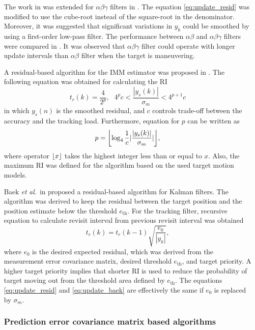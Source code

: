 \documentclass[english, 12pt, a4paper, elec, utf8, a-1b, online]{aaltothesis}
\numberwithin{equation}{section}
\newcommand{\etal}{\textit{et al}.~}
\newcommand{\ri}{t_r}
\DeclarePairedDelimiter\floor{\lfloor}{\rfloor}
\begin{document}
The work in \cite{Cohen1986} was extended for $\alpha\beta\gamma$ filters \cite{Brookner1998} in \cite{Gardner1988}. 
The equation \eqref{eq:update_resid} was modified to use the cube-root instead of the square-root in the denominator.
Moreover, it was suggested that significant variations in $y_k$ could be smoothed by using a first-order low-pass filter.
The performance between $\alpha\beta$ and $\alpha\beta\gamma$ filters were compared in \cite{Munu1992}.
It was observed that $\alpha\beta\gamma$ filter could operate with longer update intervals than $\alpha\beta$ filter when the target is maneuvering.

A residual-based algorithm for the IMM estimator was proposed in \cite{ChengTing2007}.
The following equation was obtained for calculating the RI
\begin{equation}
    \ri(k) = \frac{4}{2^p}, \text{ } 4^p c < \frac{|y_s(k)|}{\sigma_m} < 4^{p+1}c
\end{equation}
in which $y_s(n)$ is the smoothed residual, and $c$ controls trade-off between the accuracy and the tracking load.
Furthermore, equation for $p$ can be written as
\begin{equation}
    p = \floor*{\log_4\frac{1}{c}|\frac{|y_s(k)|}{\sigma_m}|},
\end{equation}
where operator $\floor*{x}$ takes the highest integer less than or equal to $x$.
Also, the maximum RI was defined for the algorithm based on the used target motion models.

Baek \etal in \cite{Baek2010} proposed a residual-based algorithm for Kalman filters.
The algorithm was derived to keep the residual between the target position and the position estimate below the threshold $e_\text{th}$.
For the tracking filter, recursive equation to calculate revisit interval from previous revisit interval was obtained
\begin{equation}\label{eq:update_baek}
    \ri(k) = \ri(k - 1) \sqrt{\frac{e_0}{|y_k|}},
\end{equation}
where $e_0$ is the desired expected residual, which was derived from the measurement error covariance matrix, desired threshold $e_\text{th}$, and target priority.
A higher target priority implies that shorter RI is used to reduce the probability of target moving out from the threshold area defined by $e_\text{th}$.
The equations \eqref{eq:update_resid} and \eqref{eq:update_baek} are effectively the same if $e_0$ is replaced by $\sigma_m$.


\subsubsection{Prediction error covariance matrix based algorithms}
\end{document}
